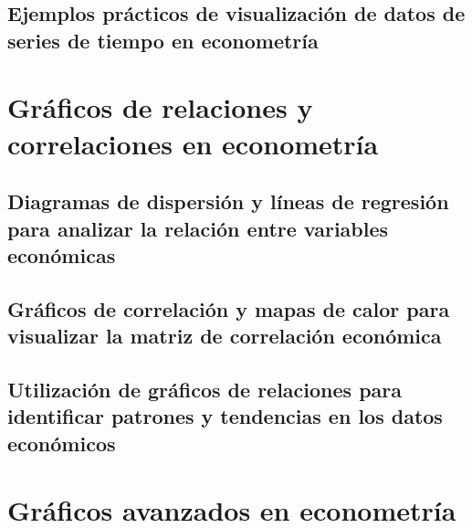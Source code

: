 \documentclass[
  a4paper,
]{article}
\begin{document}
\hypertarget{ejemplos-pruxe1cticos-de-visualizaciuxf3n-de-datos-de-series-de-tiempo-en-econometruxeda}{%
\subsection{Ejemplos prácticos de visualización de datos de series de
tiempo en
econometría}\label{ejemplos-pruxe1cticos-de-visualizaciuxf3n-de-datos-de-series-de-tiempo-en-econometruxeda}}

\hypertarget{gruxe1ficos-de-relaciones-y-correlaciones-en-econometruxeda}{%
\section{Gráficos de relaciones y correlaciones en
econometría}\label{gruxe1ficos-de-relaciones-y-correlaciones-en-econometruxeda}}

\hypertarget{diagramas-de-dispersiuxf3n-y-luxedneas-de-regresiuxf3n-para-analizar-la-relaciuxf3n-entre-variables-econuxf3micas}{%
\subsection{Diagramas de dispersión y líneas de regresión para analizar
la relación entre variables
económicas}\label{diagramas-de-dispersiuxf3n-y-luxedneas-de-regresiuxf3n-para-analizar-la-relaciuxf3n-entre-variables-econuxf3micas}}

\hypertarget{gruxe1ficos-de-correlaciuxf3n-y-mapas-de-calor-para-visualizar-la-matriz-de-correlaciuxf3n-econuxf3mica}{%
\subsection{Gráficos de correlación y mapas de calor para visualizar la
matriz de correlación
económica}\label{gruxe1ficos-de-correlaciuxf3n-y-mapas-de-calor-para-visualizar-la-matriz-de-correlaciuxf3n-econuxf3mica}}

\hypertarget{utilizaciuxf3n-de-gruxe1ficos-de-relaciones-para-identificar-patrones-y-tendencias-en-los-datos-econuxf3micos}{%
\subsection{Utilización de gráficos de relaciones para identificar
patrones y tendencias en los datos
económicos}\label{utilizaciuxf3n-de-gruxe1ficos-de-relaciones-para-identificar-patrones-y-tendencias-en-los-datos-econuxf3micos}}

\hypertarget{gruxe1ficos-avanzados-en-econometruxeda}{%
\section{Gráficos avanzados en
econometría}\label{gruxe1ficos-avanzados-en-econometruxeda}}
\end{document}
